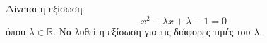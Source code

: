 Δίνεται η εξίσωση 
\[ x^2-\lambda x+\lambda-1=0 \]
όπου $ \lambda\in\mathbb{R} $. Να λυθεί η εξίσωση για τις διάφορες τιμές του $ \lambda $.
